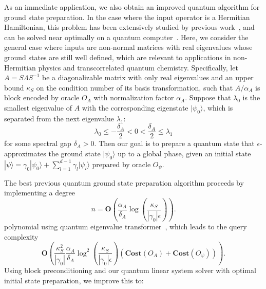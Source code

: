 \documentclass[letterpaper,onecolumn,11pt,accepted=2026-02-14]{quantumarticle}
\theoremstyle{remark}
\theoremstyle{plain}
\newcommand{\ket}[1]{|#1\rangle}
\begin{document}
As an immediate application, we also obtain an improved quantum algorithm for ground state preparation.  In the case where the input operator is a Hermitian Hamiltonian, this problem has been extensively studied by previous work~\cite{Poulin09,Ge19}, and can be solved near optimally on a quantum computer~\cite{Lin2020nearoptimalground}.
Here, we consider the general case where inputs are non-normal matrices with real eigenvalues whose ground states are still well defined, which are relevant to applications in non-Hermitian physics and transcorrelated quantum chemistry.
Specifically, let $A=S\Lambda S^{-1}$ be a diagonalizable matrix with only real eigenvalues and an upper bound $\kappa_S$ on the condition number of its basis transformation, such that $A/\alpha_A$ is block encoded by oracle $O_A$ with normalization factor $\alpha_A$.
Suppose that $\lambda_0$ is the smallest eigenvalue of $A$ with the corresponding eigenstate $\ket{\psi_0}$, which is separated from the next eigenvalue $\lambda_1$:
\begin{equation}
    \lambda_0\leq-\frac{\delta_A}{2}<0<\frac{\delta_A}{2}\leq\lambda_1
\end{equation}
for some spectral gap $\delta_A>0$.
Then our goal is to prepare a quantum state that $\epsilon$-approximates the ground state $\ket{\psi_0}$ up to a global phase, given an initial state $\ket{\psi}=\gamma_0\ket{\psi_0}+\sum_{l=1}^{d-1}\gamma_l\ket{\psi_l}$ prepared by oracle $O_{\psi}$.

The best previous quantum ground state preparation algorithm proceeds by implementing a degree
    \begin{equation}
        n=\mathbf{O}\left(\frac{\alpha_A}{\delta_A}
        \log\left(\frac{\kappa_S}{|\gamma_0|\epsilon}\right)\right).
    \end{equation}
polynomial using quantum eigenvalue transformer~\cite[Theorem 8]{QEVP}, which leads to the query complexity
\begin{equation}
    \mathbf{O}\left(\frac{\kappa_S^2}{|\gamma_0|}\frac{\alpha_A}{\delta_A}\log^2\left(\frac{\kappa_S}{|\gamma_0|\epsilon}\right)
    \left(\mathbf{Cost}\left(O_A\right)
    +\mathbf{Cost}\left(O_{\psi}\right)\right)
    \right).
\end{equation}
Using block preconditioning and our quantum linear system solver with optimal initial state preparation, we improve this to:
\end{document}
